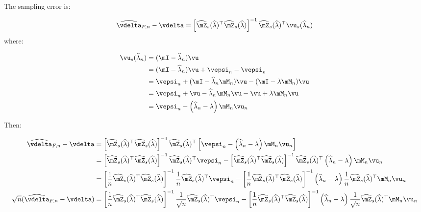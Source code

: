 \documentclass[english,12pt]{book}\usepackage[]{graphicx}\usepackage[]{xcolor}
\begin{document}
\begin{subappendices}
The sampling error is:

\begin{equation}
  \widehat{\vdelta}_{F, n} - \vdelta = \left[\widehat{\mZ}_s(\widehat{\lambda})^\top\widehat{\mZ}_s(\widehat{\lambda})\right]^{-1}\widehat{\mZ}_s(\widehat{\lambda})^\top\vu_s(\widehat{\lambda}_n)
\end{equation}
%
where:

\begin{equation}
  \begin{aligned}
    \vu_s(\widehat{\lambda}_n) & = (\mI - \widehat{\lambda}_n)\vu \\
                               & = (\mI - \widehat{\lambda}_n)\vu + \vepsi_n - \vepsi_n \\
                               & = \vepsi_n  + (\mI - \widehat{\lambda}_n\mM_n)\vu - (\mI - \lambda\mM_n)\vu \\
                               & = \vepsi_n  + \vu  - \widehat{\lambda}_n\mM_n\vu - \vu + \lambda\mM_n\vu \\
                               & = \vepsi_n - \left(\widehat{\lambda}_n- \lambda\right)\mM_n\vu_n
  \end{aligned}
\end{equation}

Then:

\begin{equation}
  \begin{aligned}
    \widehat{\vdelta}_{F, n} - \vdelta & = \left[\widehat{\mZ}_s(\widehat{\lambda})^\top\widehat{\mZ}_s(\widehat{\lambda})\right]^{-1}\widehat{\mZ}_s(\widehat{\lambda})^\top\left[\vepsi_n - \left(\widehat{\lambda}_n- \lambda\right)\mM_n\vu_n\right] \\
     & = \left[\widehat{\mZ}_s(\widehat{\lambda})^\top\widehat{\mZ}_s(\widehat{\lambda})\right]^{-1}\widehat{\mZ}_s(\widehat{\lambda})^\top\vepsi_n - \left[\widehat{\mZ}_s(\widehat{\lambda})^\top\widehat{\mZ}_s(\widehat{\lambda})\right]^{-1}\widehat{\mZ}_s(\widehat{\lambda})^\top\left(\widehat{\lambda}_n- \lambda\right)\mM_n\vu_n \\
     & = \left[\frac{1}{n}\widehat{\mZ}_s(\widehat{\lambda})^\top\widehat{\mZ}_s(\widehat{\lambda})\right]^{-1}\frac{1}{n}\widehat{\mZ}_s(\widehat{\lambda})^\top\vepsi_n - \left[\frac{1}{n}\widehat{\mZ}_s(\widehat{\lambda})^\top\widehat{\mZ}_s(\widehat{\lambda})\right]^{-1}\left(\widehat{\lambda}_n- \lambda\right)\frac{1}{n}\widehat{\mZ}_s(\widehat{\lambda})^\top\mM_n\vu_n \\
 \sqrt{n} (\widehat{\vdelta}_{F, n} - \vdelta)   & = \left[\frac{1}{n}\widehat{\mZ}_s(\widehat{\lambda})^\top\widehat{\mZ}_s(\widehat{\lambda})\right]^{-1}\frac{1}{\sqrt{n}}\widehat{\mZ}_s(\widehat{\lambda})^\top\vepsi_n - \left[\frac{1}{n}\widehat{\mZ}_s(\widehat{\lambda})^\top\widehat{\mZ}_s(\widehat{\lambda})\right]^{-1}\left(\widehat{\lambda}_n- \lambda\right)\frac{1}{\sqrt{n}}\widehat{\mZ}_s(\widehat{\lambda})^\top\mM_n\vu_n
  \end{aligned}
\end{equation}


\end{subappendices}
\end{document}
